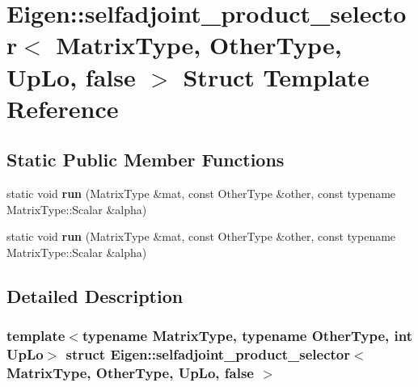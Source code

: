 \hypertarget{struct_eigen_1_1selfadjoint__product__selector_3_01_matrix_type_00_01_other_type_00_01_up_lo_00_01false_01_4}{}\section{Eigen\+:\+:selfadjoint\+\_\+product\+\_\+selector$<$ Matrix\+Type, Other\+Type, Up\+Lo, false $>$ Struct Template Reference}
\label{struct_eigen_1_1selfadjoint__product__selector_3_01_matrix_type_00_01_other_type_00_01_up_lo_00_01false_01_4}
\subsection*{Static Public Member Functions}
\begin{DoxyCompactItemize}
\item 
\mbox{\label{struct_eigen_1_1selfadjoint__product__selector_3_01_matrix_type_00_01_other_type_00_01_up_lo_00_01false_01_4_af4105cc4314d61eded8193ba3ec2069d}} 
static void {\bfseries run} (Matrix\+Type \&mat, const Other\+Type \&other, const typename Matrix\+Type\+::\+Scalar \&alpha)
\item 
\mbox{\label{struct_eigen_1_1selfadjoint__product__selector_3_01_matrix_type_00_01_other_type_00_01_up_lo_00_01false_01_4_af4105cc4314d61eded8193ba3ec2069d}} 
static void {\bfseries run} (Matrix\+Type \&mat, const Other\+Type \&other, const typename Matrix\+Type\+::\+Scalar \&alpha)
\end{DoxyCompactItemize}


\subsection{Detailed Description}
\subsubsection*{template$<$typename Matrix\+Type, typename Other\+Type, int Up\+Lo$>$\newline
struct Eigen\+::selfadjoint\+\_\+product\+\_\+selector$<$ Matrix\+Type, Other\+Type, Up\+Lo, false $>$}



